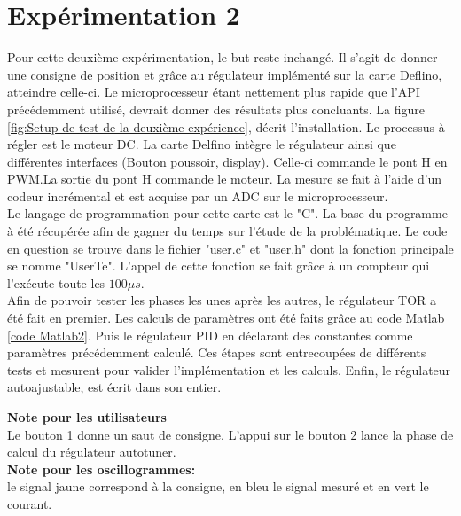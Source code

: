 \section{Expérimentation 2}
Pour cette deuxième expérimentation, le but reste inchangé. Il s'agit de donner une consigne de position et grâce au régulateur implémenté sur la carte Deflino, atteindre celle-ci. Le microprocesseur étant nettement plus rapide que l'API précédemment utilisé, devrait donner des résultats plus concluants. La figure \ref{fig:Setup de test de la deuxième expérience}, décrit l'installation. Le processus à régler est le moteur DC. La carte Delfino intègre le régulateur ainsi que différentes interfaces (Bouton poussoir, display). Celle-ci commande le pont H en PWM.La sortie du pont H commande le moteur. La mesure se fait à l'aide d'un codeur incrémental et est acquise par un ADC sur le microprocesseur.\\
Le langage de programmation pour cette carte est le "C". La base du programme à été récupérée afin de gagner du temps sur l'étude de la problématique. Le code en question se trouve dans le fichier "user.c" et "user.h" dont la fonction principale se nomme "UserTe". L'appel de cette fonction se fait grâce à un compteur qui l'exécute toute les $100\mu s$.\\
Afin de pouvoir tester les phases les unes après les autres, le régulateur TOR a été fait en premier. Les calculs de paramètres ont été faits grâce au code Matlab \ref{code Matlab2}. Puis le régulateur PID en déclarant des constantes comme paramètres précédemment calculé. Ces étapes sont entrecoupées de différents tests et mesurent pour valider l'implémentation et les calculs. Enfin, le régulateur autoajustable, est écrit dans son entier.

\textbf{Note pour les utilisateurs}\\
Le bouton 1 donne un saut de consigne. L'appui sur le bouton 2 lance la phase de calcul du régulateur autotuner.\\
\textbf{Note pour les oscillogrammes:}\\
le signal jaune correspond à la consigne, en bleu le signal mesuré et en vert le courant.\\

